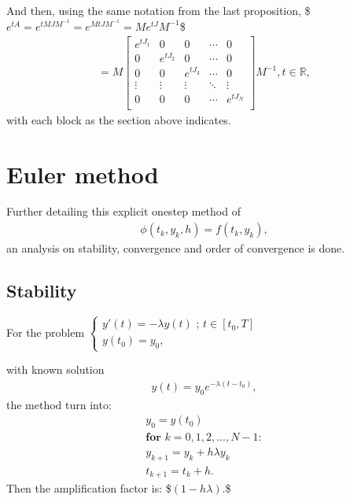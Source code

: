 \documentclass[letterpaper,10pt,english]{jupyterBook}
\begin{document}
\sphinxAtStartPar
And then, using the same notation from the last proposition,
\$\(
e^{tA} = e^{tMJM^{-1}} = e^{MtJM^{-1}} = Me^{tJ}M^{-1} 
\)\$
\begin{equation*}
\begin{split}
    = M \left[ { \begin{array}{ccccc}
        e^{tJ_1} & 0 & 0 & \dotsm & 0\\
        0 & e^{tJ_2} & 0 & \dotsm & 0\\
        0 & 0 & e^{tJ_3} & \dotsm & 0\\
        \vdots & \vdots & \vdots & \ddots & \vdots\\
        0 & 0 & 0 & \dotsm & e^{tJ_{N}}\\
    \end{array} } \right] M^{-1}, t \in \mathbb{R},
\end{split}
\end{equation*}
\sphinxAtStartPar
with each block as the section above indicates.


\section{Euler method}
\label{\detokenize{appendix:euler-method}}
\sphinxAtStartPar
Further detailing this explicit one\sphinxhyphen{}step method of
\begin{equation*}
\begin{split}
    \phi (t_{k},y_{k},h) = f(t_{k},y_{k}),
\end{split}
\end{equation*}
\sphinxAtStartPar
an analysis on stability, convergence and order of convergence is done.


\subsection{Stability}
\label{\detokenize{appendix:stability}}
\sphinxAtStartPar
For the problem
\(\begin{cases}
    y'(t) = - \lambda y(t) \text{ ; } t \in [t_0 , T] \\
    y(t_0)=y_0,
\end{cases}\)

\sphinxAtStartPar
with known solution
\begin{equation*}
\begin{split} y(t) = y_0e^{-\lambda (t-t_0)},\end{split}
\end{equation*}
\sphinxAtStartPar
the method turn into:
\begin{equation*}
\begin{split}
y_0 = y(t_0)\\
\textbf{for } k = 0, 1, 2, ..., N-1 :\\
    y_{k+1} = y_k + h \lambda y_k \\
    t_{k+1} = t_k + h.
\end{split}
\end{equation*}
\sphinxAtStartPar
Then the amplification factor is:
\$\(
(1 - h \lambda).
\)\$
\end{document}
